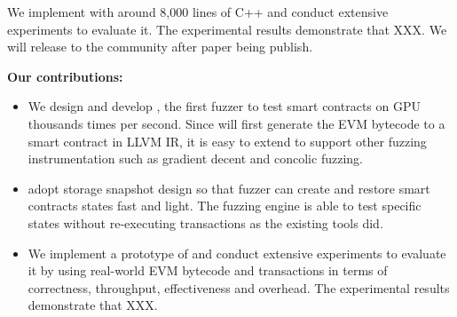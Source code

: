 We implement {\tool} with around 8,000 lines of C++ and conduct extensive experiments to evaluate it. 
The experimental results demonstrate that {\tool} XXX. 
We will release {\tool} to the community after paper being publish.



\noindent\textbf{Our contributions:}
\begin{itemize}
    \item We design and develop {\tool}, the first fuzzer to test smart contracts on GPU thousands times per second.
    Since {\tool} will first generate the EVM bytecode to a smart contract in LLVM IR, it is easy to extend {\tool} to support other fuzzing instrumentation such as gradient decent\cite{angora_sp} and concolic fuzzing\cite{symcc_sec}.
    \item {\tool} adopt storage snapshot design so that fuzzer can create and restore smart contracts states fast and light. The fuzzing engine is able to test specific states without re-executing transactions as the existing tools did.
    \item We implement a prototype of {\tool} and conduct extensive experiments to evaluate it by using real-world EVM bytecode and transactions in terms of correctness, throughput, effectiveness and overhead.
    The experimental results demonstrate that XXX.
\end{itemize}




 